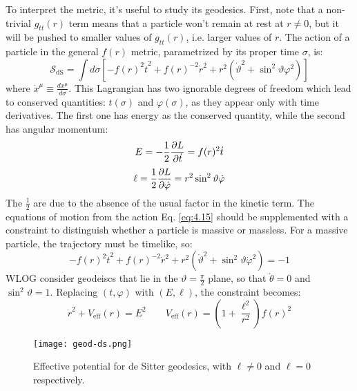 To interpret the metric, it's useful to study its geodesics. First, note that a non-trivial $ g_{tt}(r) $ term means that a particle won't remain at rest at $ r \neq 0 $, but it will be pushed to smaller values of $ g_{tt}(r) $, i.e. larger values of $ r $. The action of a particle in the general $ f(r) $ metric, parametrized by its proper time $ \sigma $, is:
\begin{equation}
  \mathcal{S}_{\text{dS}} = \int d\sigma \left[ - f(r)^2 \dot{t}^2 + f(r)^{-2} \dot{r}^2 + r^2 (\dot{\vartheta}^2 + \sin^2 \vartheta \varphi^2) \right]
  \label{eq:4.15}
\end{equation}
where $ \dot{x}^\mu \equiv \frac{dx^\mu}{d\sigma} $. This Lagrangian has two ignorable degrees of freedom which lead to conserved quantities: $ t(\sigma) $ and $ \varphi(\sigma) $, as they appear only with time derivatives. The first one has energy as the conserved quantity, while the second has angular momentum:
\begin{equation}
  E = - \frac{1}{2} \frac{\partial L}{\partial \dot{t}} = f(r)^2 \dot{t}
  \label{eq:4.16}
\end{equation}
\begin{equation}
  \ell = \frac{1}{2} \frac{\partial L}{\partial \dot{\varphi}} = r^2 \sin^2 \vartheta \dot{\varphi}
  \label{eq:4.17}
\end{equation}
The $ \frac{1}{2} $ are due to the absence of the usual factor in the kinetic term. The equations of motion from the action Eq. \ref{eq:4.15} should be supplemented with a constraint to distinguish whether a particle is massive or massless. For a massive particle, the trajectory must be timelike, so:
\begin{equation*}
  - f(r)^2 \dot{t}^2 + f(r)^{-2} \dot{r}^2 + r^2 (\dot{\vartheta}^2 + \sin^2 \vartheta \dot{\varphi}^2) = -1
\end{equation*}
WLOG consider geodeiscs that lie in the $ \vartheta = \frac{\pi}{2} $ plane, so that $ \dot{\theta} = 0 $ and $ \sin^2 \vartheta = 1 $. Replacing $ (t,\varphi) $ with $ (E,\ell) $, the constraint becomes:
\begin{equation}
  \dot{r}^2 + V_{\text{eff}}(r) = E^2
  \qquad
  V_{\text{eff}}(r) = \left( 1 + \frac{\ell^2}{r^2} \right) f(r)^2
  \label{eq:4.18}
\end{equation}

\begin{figure}
  \centering
  \texttt{[image: geod-ds.png]}
  \caption{Effective potential for de Sitter geodesics, with $ \ell \neq 0 $ and $ \ell = 0 $ respectively.}
  \label{geo-ds}
\end{figure}

